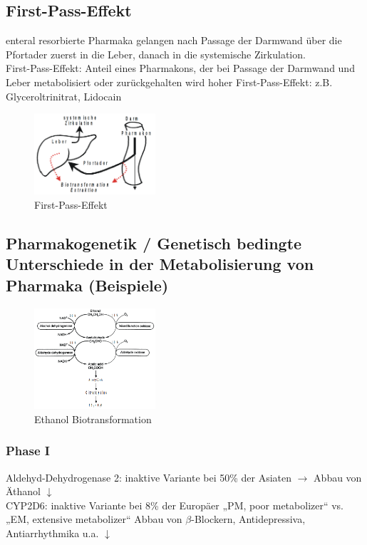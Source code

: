 \documentclass[10pt,a4paper]{report}
\begin{document}
\subsection{First-Pass-Effekt} 
enteral resorbierte Pharmaka gelangen nach Passage der Darmwand über die Pfortader zuerst in die Leber, danach in die systemische Zirkulation.\\
First-Pass-Effekt: Anteil eines Pharmakons, der bei Passage der Darmwand und Leber metabolisiert oder zurückgehalten wird hoher First-Pass-Effekt: z.B. Glyceroltrinitrat, Lidocain

\begin{figure}[h]
	\centering 
	\includegraphics[width=0.4\textwidth]{Bilder/firstpass.png} 
	\caption{First-Pass-Effekt} 
	\label{fig:FirstPass}
\end{figure}

\subsection{Pharmakogenetik / Genetisch bedingte Unterschiede in der Metabolisierung von Pharmaka (Beispiele)} 

\begin{figure}[h]
	\centering 
	\includegraphics[width=0.4\textwidth]{Bilder/ethanolbiotransformation.png} 
	\caption{Ethanol Biotransformation} 
	\label{fig:EthanolBiotransformation}
\end{figure}

\subsubsection{Phase I} 
Aldehyd-Dehydrogenase 2: inaktive Variante bei 50\% der Asiaten $\rightarrow$ Abbau von Äthanol $\downarrow$\\ 
CYP2D6:	inaktive Variante bei 8\% der Europäer „PM, poor metabolizer“ vs. „EM, extensive metabolizer“ Abbau von $\beta$-Blockern, Antidepressiva, Antiarrhythmika u.a. $\downarrow$
\end{document}
